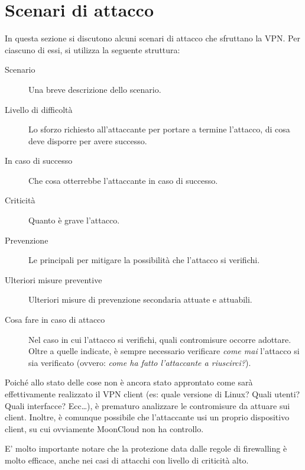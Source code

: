 \section{Scenari di attacco}\label{sec:attacks}

In questa sezione si discutono alcuni scenari di attacco
che sfruttano la VPN.
Per ciascuno di essi, si utilizza la seguente struttura:
\begin{description}
    \item[Scenario]Una breve descrizione dello scenario.
    \item[Livello di difficoltà]Lo sforzo richiesto all'attaccante
    per portare a termine l'attacco, di cosa deve disporre per avere
    successo.
    \item[In caso di successo]Che cosa otterrebbe l'attaccante
    in caso di successo.
    \item[Criticità]Quanto è grave l'attacco.
    \item[Prevenzione]Le principali 
    per mitigare la possibilità che l'attacco si verifichi.
    \item[Ulteriori misure preventive]Ulteriori misure
    di prevenzione secondaria attuate e attuabili.
    \item[Cosa fare in caso di attacco]Nel caso in cui
    l'attacco si verifichi, quali contromisure occorre
    adottare. Oltre a quelle indicate, è sempre necessario
    verificare \textit{come mai} l'attacco si sia verificato
    (ovvero: \textit{come ha fatto l'attaccante a riuscirci?}).
\end{description}
Poiché allo stato delle cose non è ancora stato approntato come
sarà effettivamente realizzato il VPN client (es: quale versione
di Linux? Quali utenti? Quali interfacce? Ecc\ldots), è prematuro
analizzare le contromisure da attuare sui client.
Inoltre, è comunque possibile che l'attaccante usi un proprio
dispositivo client, su cui ovviamente MoonCloud non ha controllo.

E' molto importante notare che la protezione data dalle regole di
firewalling è molto efficace, anche nei casi di attacchi con livello
di criticità alto.




